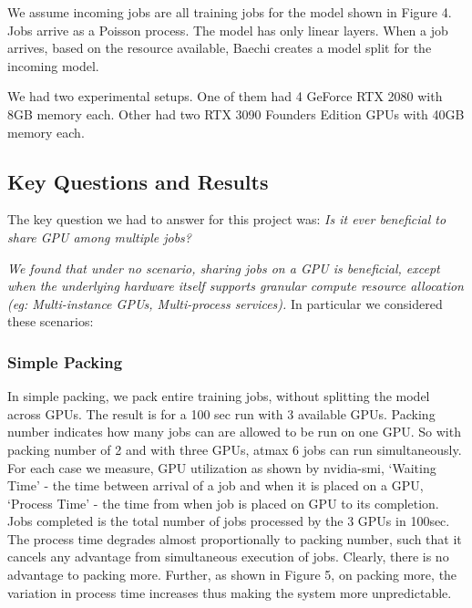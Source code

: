 We assume incoming jobs are all training jobs for the model shown in Figure 4.
Jobs arrive as a Poisson process. The model has only linear layers. When a job arrives, based on the resource available,  Baechi creates a model split for the incoming model. 

We had two experimental setups. One of them had 4 GeForce RTX 2080 with 8GB memory each. Other had two RTX 3090 Founders Edition GPUs with 40GB memory each.


\subsection{Key Questions and Results}

The key question we had to answer for this project was: \emph{Is it ever beneficial to share GPU among multiple jobs?}

\emph{We found that under no scenario, sharing jobs on a GPU is beneficial, except when the underlying hardware itself supports granular compute resource allocation (eg: Multi-instance GPUs, Multi-process services).} In particular we considered these scenarios:

\subsubsection{Simple Packing}

In simple packing, we pack entire training jobs, without splitting the model across GPUs. The result is for a 100 sec run with 3 available GPUs. Packing number indicates how many jobs can are allowed to be run on one GPU. So with packing number of 2 and with three GPUs, atmax 6 jobs can run simultaneously. For each case we measure, GPU utilization as shown by nvidia-smi, `Waiting Time' - the time between arrival of a job and when it is placed on a GPU, `Process Time' - the time from when job is placed on GPU to its completion. Jobs completed is the total number of jobs processed by the 3 GPUs in 100sec. The process time degrades almost proportionally to packing number, such that it cancels any advantage from simultaneous execution of jobs. Clearly, there is no advantage to packing more. Further, as shown in Figure 5, on packing more, the variation in process time increases thus making the system more unpredictable.

